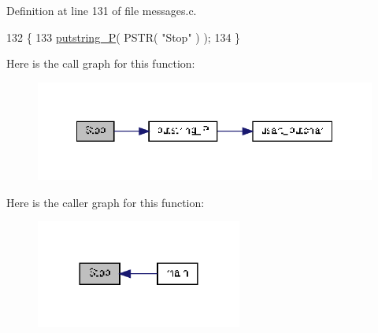Definition at line 131 of file messages.\-c.


\begin{DoxyCode}
132 \{
133     \hyperlink{group__biba__utils_gaf1b54c4c5b890362b485636395859b3d}{putstring\_P}( PSTR( \textcolor{stringliteral}{"Stop"} ) );
134 \}
\end{DoxyCode}


Here is the call graph for this function\-:
\nopagebreak
\begin{figure}[H]
\begin{center}
\leavevmode
\includegraphics[width=342pt]{group__biba__messges_ga76c658dc5f4332e4b034419dca518c1c_cgraph}
\end{center}
\end{figure}




Here is the caller graph for this function\-:
\nopagebreak
\begin{figure}[H]
\begin{center}
\leavevmode
\includegraphics[width=192pt]{group__biba__messges_ga76c658dc5f4332e4b034419dca518c1c_icgraph}
\end{center}
\end{figure}


